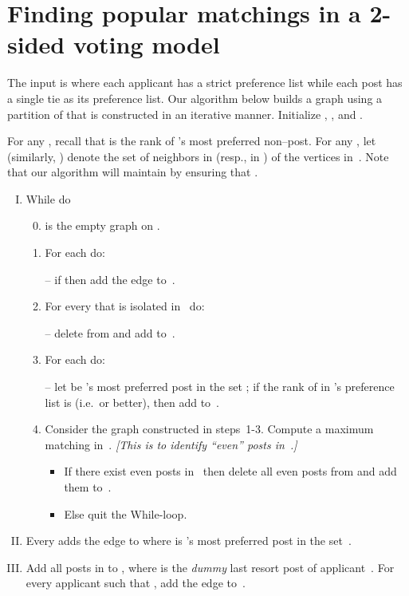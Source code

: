 \documentclass[11pt]{llncs}
\begin{document}
\section{Finding popular matchings in a 2-sided voting model}
\label{sec:algo}
The input is  where each applicant  has a strict preference list 
while each post  has a single tie as its preference list. Our algorithm below builds 
a graph  using a partition  of  that is 
constructed in an iterative manner.
Initialize , , and . 

For any , recall that  is the rank of 's most preferred non--post.
For any , let  (similarly, ) denote the set of neighbors in 
 (resp., in ) of the vertices in~. Note that our algorithm will maintain
 by ensuring that . 


\begin{enumerate}[(I)]
\item While  do
\begin{enumerate}[1.]
\setcounter{enumii}{-1}
\item  is the empty graph on .
\item For each  do: 

-- if  then add the edge  to~.

\item For every  that is isolated in~ do: 

-- delete  from  and add  to~.

\item For each  do: 

-- let  be 's most preferred post in the set ; if the rank of  in 's preference 
list is  (i.e.\  or better), then add  to~.

\item Consider the graph  constructed in steps~1-3.  Compute a maximum matching in~. 
{\em [This is to identify ``even'' posts in~.]}
\begin{itemize}
\item If there exist even posts in~ then delete all even posts from  and add them 
to~.
\item Else quit the While-loop.
\end{itemize}
\end{enumerate}

\smallskip

\item Every  adds the edge  to  where  is 's most preferred post 
in the set~. 

\smallskip

\item Add all posts in  to , where 
 is the {\em dummy} last resort post of applicant~. For every applicant  such that 
, add the edge  to~. 
\end{enumerate}
\end{document}
